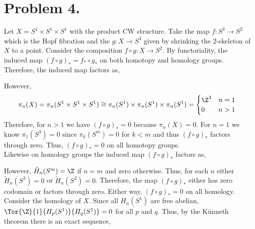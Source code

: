 \documentclass[12pt]{extarticle}
\begin{document}
\section*{Problem 4.}

Let $X = S^1 \times S^1 \times S^1$ with the product CW structure. Take the map $f : S^3 \to S^2$ which is the Hopf fibration and the $g : X \to S^3$ given by shrinking the $2$-skeleton of $X$ to a point. Consider the composition $f \circ g : X \to S^2$. By functoriality, the induced map $(f \circ g)_* = f_* \circ g_*$ on both homotopy and homology groups. Therefore, the induced map factors as,
\begin{center}
\end{center}
However, 
\[ \pi_n(X) = \pi_n(S^1 \times S^1 \times S^1) \cong \pi_n(S^1) \times \pi_n(S^1) \times \pi_n(S^1) = 
\begin{cases}
\Z^3 & n = 1
\\
0 & n > 1
\end{cases}\]
Therefore, for $n > 1$ we have $(f \circ g)_* = 0$ because $\pi_n(X) = 0$. For $n = 1$ we know $\pi_1(S^3) = 0$ since $\pi_k(S^m) = 0$ for $k < m$ and thus $(f \circ g)_*$ factors through zero. Thus, $(f \circ g)_* = 0$ on all homotopy groups. 
\bigskip\\
Likewise on homology groups the induced map $(f \circ g)_*$ factors as,
\begin{center}
\end{center}
However, $\tilde{H}_n(S^m) = \Z$ if $n = m$ and zero otherwise. Thus, for each $n$ either $\tilde{H}_n(S^3) = 0$ or $\tilde{H}_n(S^2) = 0$. Therefore, the map $(f \circ g)_*$ either has zero codomain or factors through zero. Either way, $(f \circ g)_* = 0$ on all homology.
\bigskip\\
Consider the homology of $X$. Since all $H_n(S^1)$ are free abelian, $\Tor{\Z}{1}{H_{p}(S^1)}{H_q(S^1)} = 0$ for all $p$ and $q$. Thus, by the K\"{u}nneth theorem there is an exact sequence,
\begin{center}
\end{center}  
\end{document}
